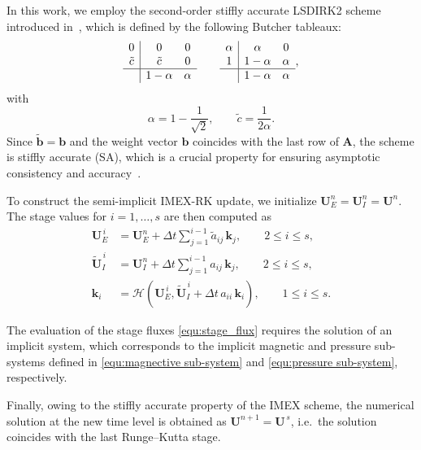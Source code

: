 \documentclass[a4paper,fleqn]{cas-sc}
\theoremstyle{definition}
\theoremstyle{remark}
\begin{document}
In this work, we employ the second-order stiffly accurate LSDIRK2 scheme
introduced in~\cite{LSDIRK2}, which is defined by the following Butcher
tableaux:
\begin{equation}
\label{eq:butcher}
\begin{array}{c|cc}
0 & 0 & 0 \\
\tilde{c} & \tilde{c} & 0 \\
\hline
& 1-\alpha & \alpha
\end{array}
\qquad
\begin{array}{c|cc}
\alpha & \alpha & 0 \\
1 & 1-\alpha & \alpha \\
\hline
& 1-\alpha & \alpha
\end{array},
\end{equation}
with
\[
\alpha = 1 - \frac{1}{\sqrt{2}},
\qquad
\tilde{c} = \frac{1}{2\alpha}.
\]
Since $\tilde{\mathbf{b}} = \mathbf{b}$ and the weight vector
$\mathbf{b}$ coincides with the last row of $\mathbf{A}$, the scheme is
stiffly accurate (SA), which is a crucial property for ensuring asymptotic
consistency and accuracy~\cite{BOSCARINO2019594}.

To construct the semi-implicit IMEX-RK update, we initialize
$\mathbf{U}_E^n = \mathbf{U}_I^n = \mathbf{U}^n$.
The stage values for $i = 1, \dots, s$ are then computed as
\begin{equation}
\label{equ:stage_flux}
    \begin{aligned}
\mathbf{U}_E^{\,i}
&=
\mathbf{U}_E^n
+
\Delta t
\sum_{j=1}^{i-1}
\tilde{a}_{ij}\,\mathbf{k}_j,
\qquad 2 \le i \le s,
\\
\tilde{\mathbf{U}}_I^{\,i}
&=
\mathbf{U}_I^n
+
\Delta t
\sum_{j=1}^{i-1}
a_{ij}\,\mathbf{k}_j,
\qquad 2 \le i \le s,
\\
\mathbf{k}_i
&=
\mathcal{H}
\!\left(
\mathbf{U}_E^{\,i},
\tilde{\mathbf{U}}_I^{\,i}
+
\Delta t\, a_{ii}\,\mathbf{k}_i
\right),
\qquad 1 \le i \le s.
\end{aligned}
\end{equation}


The evaluation of the stage fluxes \eqref{equ:stage_flux} requires the solution of an
implicit system, which corresponds to the implicit magnetic and pressure
sub-systems defined in \eqref{equ:magnective sub-system} and \eqref{equ:pressure sub-system}, respectively.

Finally, owing to the stiffly accurate property of the IMEX scheme,
the numerical solution at the new time level is obtained as $\mathbf{U}^{n+1} = \mathbf{U}^{\,s}$,
i.e.\ the solution coincides with the last Runge--Kutta stage.
\end{document}
